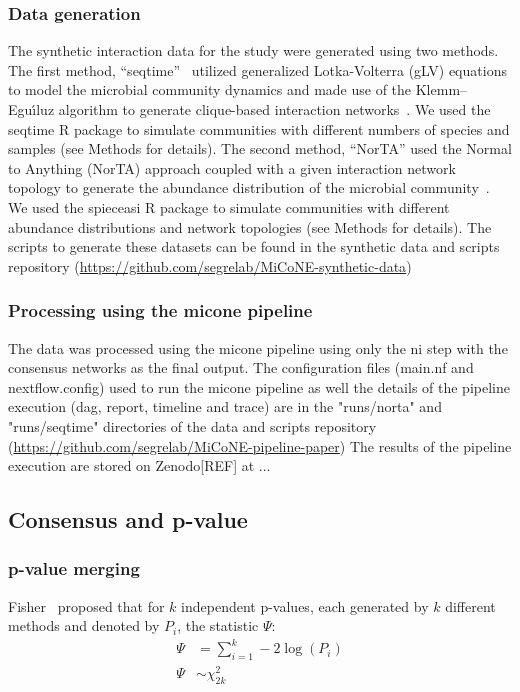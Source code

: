     \subsubsection*{Data generation}
    The synthetic interaction data for the study were generated using two methods.
    The first method, ``seqtime''~\cite{faustSignaturesEcologicalProcesses2018} utilized generalized Lotka-Volterra (gLV) equations to model the microbial community dynamics and made use of the Klemm–Eguı́luz algorithm to generate clique-based interaction networks~\cite{Rottjers2018}.
    We used the seqtime R package to simulate communities with different numbers of species and samples (see Methods for details).
    The second method, ``NorTA'' used the Normal to Anything (NorTA) approach coupled with a given interaction network topology to generate the abundance distribution of the microbial community~\cite{Kurtz2015}.
    We used the spieceasi R package to simulate communities with different abundance distributions and network topologies (see Methods for details).
    The scripts to generate these datasets can be found in the synthetic data and scripts repository (\href{https://github.com/segrelab/MiCoNE-synthetic-data}{https://github.com/segrelab/MiCoNE-synthetic-data})

    \subsubsection*{Processing using the \ac{micone} pipeline}
    The data was processed using the \ac{micone} pipeline using only the \ac{ni} step with the consensus networks as the final output.
    The configuration files (main.nf and nextflow.config) used to run the \ac{micone} pipeline as well the details of the pipeline execution (dag, report, timeline and trace) are in the "runs/norta" and "runs/seqtime" directories of the data and scripts repository (\href{https://github.com/segrelab/MiCoNE-pipeline-paper}{https://github.com/segrelab/MiCoNE-pipeline-paper})
    The results of the pipeline execution are stored on Zenodo[REF] at ...

  \subsection*{Consensus and p-value}

  \subsubsection*{p-value merging}
  Fisher~\cite{fisher_224a_1948} proposed that for $k$ independent p-values, each generated by $k$ different methods and denoted by $P_i$, the statistic $\Psi$:
  \begin{equation*}
    \begin{aligned}
        \Psi &= \sum_{i=1}^k -2 \log \left( P_i \right) \\
        \Psi &\sim \chi^2_{2k}
    \end{aligned}
  \end{equation*}

